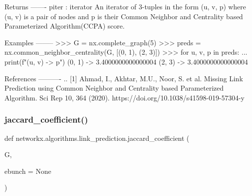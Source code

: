 \begin{DoxyVerb}
Returns
-------
piter : iterator
    An iterator of 3-tuples in the form (u, v, p) where (u, v) is a
    pair of nodes and p is their Common Neighbor and Centrality based
    Parameterized Algorithm(CCPA) score.

Examples
--------
>>> G = nx.complete_graph(5)
>>> preds = nx.common_neighbor_centrality(G, [(0, 1), (2, 3)])
>>> for u, v, p in preds:
...     print(f"({u}, {v}) -> {p}")
(0, 1) -> 3.4000000000000004
(2, 3) -> 3.4000000000000004

References
----------
.. [1] Ahmad, I., Akhtar, M.U., Noor, S. et al.
       Missing Link Prediction using Common Neighbor and Centrality based Parameterized Algorithm.
       Sci Rep 10, 364 (2020).
       https://doi.org/10.1038/s41598-019-57304-y
\end{DoxyVerb}
 \mbox{\label{namespacenetworkx_1_1algorithms_1_1link__prediction_aafb6cb724a33fc47e2722a29aa23f65d}} 
\subsubsection{\texorpdfstring{jaccard\+\_\+coefficient()}{jaccard\_coefficient()}}
{\footnotesize\ttfamily def networkx.\+algorithms.\+link\+\_\+prediction.\+jaccard\+\_\+coefficient (\begin{DoxyParamCaption}\item[{}]{G,  }\item[{}]{ebunch = {\ttfamily None} }\end{DoxyParamCaption})}

